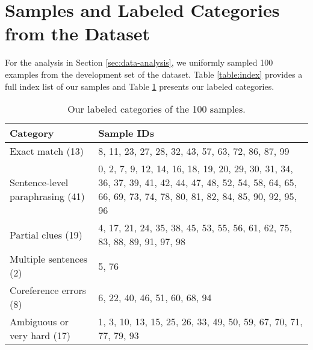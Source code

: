 \section{Samples and Labeled Categories from the  Dataset}
\label{appendix:samples}
For the analysis in Section \ref{sec:data-analysis}, we uniformly sampled 100 examples from the development set of the  dataset.  Table \ref{table:index} provides a full index list of our samples and Table \ref{table:categories} presents our labeled categories.

\begin{table}[htp]
    \centering
    \begin{tabular}{p{5cm}|p{8cm}}
    \toprule
    Category & Sample IDs \\
    \midrule
    Exact match (13) & 8, 11, 23, 27, 28, 32, 43, 57, 63, 72, 86, 87, 99 \\
    \midrule
    Sentence-level paraphrasing (41) & 0, 2, 7, 9, 12, 14, 16, 18, 19, 20, 29, 30, 31, 34, 36, 37, 39, 41, 42, 44, 47, 48, 52,
54, 58, 64, 65, 66, 69, 73, 74, 78, 80, 81, 82, 84, 85, 90, 92, 95, 96 \\
    \midrule
    Partial clues (19) & 4, 17, 21, 24, 35, 38, 45, 53, 55, 56, 61, 62, 75, 83, 88, 89, 91, 97, 98 \\
    \midrule
    Multiple sentences (2) & 5, 76 \\
    \midrule
    Coreference errors (8) & 6, 22, 40, 46, 51, 60, 68, 94 \\
    \midrule
    Ambiguous or very hard (17) & 1, 3, 10, 13, 15, 25, 26, 33, 49, 50, 59, 67, 70, 71, 77, 79, 93 \\
    \bottomrule
    \end{tabular}
    \caption{Our labeled categories of the 100 samples.}
    \label{table:categories}
\end{table}

